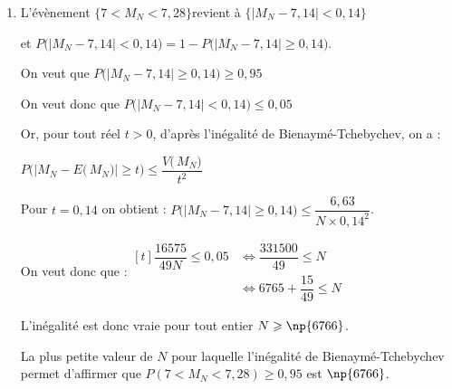 \begin{enumerate}
\begin{enumerate}
$V\left(M_{N}\right)=\dfrac{V(X)}{N}= \dfrac{6,63}{N}$.
		\item L'évènement \quad $\big\{ 7<M_{N}<7,28 \big\}$\quad revient à \quad $\big\{\big|M_{N} - 7,14\big| < 0,14\big\}$

et \quad $P\Big(\big|M_N - 7,14 \big| < 0,14\Big) = 1 - P\Big(\big|M_{N} - 7,14 \big| \geqslant 0,14\Big)$.

On veut que $P\Big(\big|M_{N} - 7,14 \big| \geqslant 0,14\Big) \geqslant 0,95$

On veut donc que $P\Big(\big|M_N - 7,14 \big| < 0,14\Big) \leqslant 0,05$

Or, pour tout réel $t > 0$, d'après l'inégalité de Bienaymé-Tchebychev, on a :

$P\Big(\big|M_N-E\big(\,M_N\big)\big| \geqslant t\Big) \leqslant \dfrac{V\big(\,M_N\big)}{t^2}$

Pour $t = 0,14$ on obtient : $ P\Big(\big|M_N-7,14\big| \geqslant 0,14\Big)\leqslant \dfrac{6,63}{ N \times 0,14^2}$.

On veut donc que :\quad $\begin{aligned}[t]
	\dfrac{16575}{49 N} \leqslant 0,05 &\iff
	\dfrac{331500}{49} \leqslant N \\
	&\iff 6765+\dfrac{15}{49}\leqslant N
\end{aligned}$

L'inégalité est donc vraie pour tout entier $N \geqslant \np{6766}$.

La plus petite valeur de $N$ pour laquelle l'inégalité de Bienaymé-Tchebychev permet d'affirmer que $P\left(7<M_{N}<7,28\right) \geqslant 0,95$ est $\np{6766}$.

	\end{enumerate}
\end{enumerate}

\bigskip

